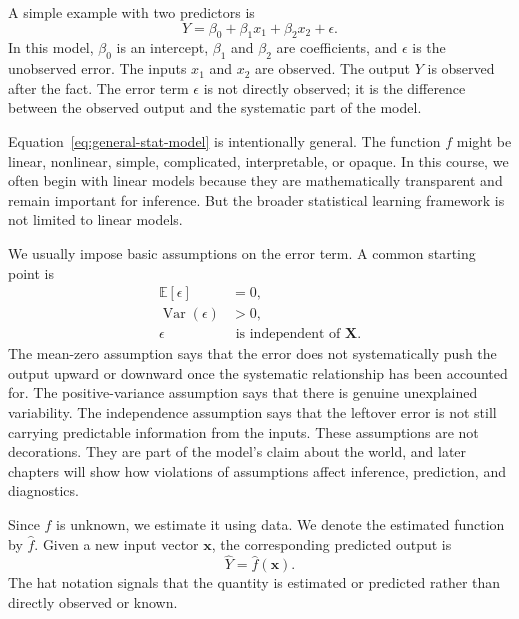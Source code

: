 A simple example with two predictors is
\begin{equation}
  Y = \beta_0 + \beta_1 x_1 + \beta_2 x_2 + \epsilon.
  \label{eq:first-linear-example}
\end{equation}
In this model, $\beta_0$ is an intercept, $\beta_1$ and $\beta_2$ are coefficients, and $\epsilon$ is the unobserved error.  The inputs $x_1$ and $x_2$ are observed.  The output $Y$ is observed after the fact.  The error term $\epsilon$ is not directly observed; it is the difference between the observed output and the systematic part of the model.

Equation~\eqref{eq:general-stat-model} is intentionally general.  The function $f$ might be linear, nonlinear, simple, complicated, interpretable, or opaque.  In this course, we often begin with linear models because they are mathematically transparent and remain important for inference.  But the broader statistical learning framework is not limited to linear models.

We usually impose basic assumptions on the error term.  A common starting point is
\begin{align}
  \mathbb{E}[\epsilon] &= 0, \label{eq:error-mean-zero}\\
  \operatorname{Var}(\epsilon) &> 0, \label{eq:error-positive-variance}\\
  \epsilon &\text{ is independent of } \mathbf{X}. \label{eq:error-independent}
\end{align}
The mean-zero assumption says that the error does not systematically push the output upward or downward once the systematic relationship has been accounted for.  The positive-variance assumption says that there is genuine unexplained variability.  The independence assumption says that the leftover error is not still carrying predictable information from the inputs.  These assumptions are not decorations.  They are part of the model's claim about the world, and later chapters will show how violations of assumptions affect inference, prediction, and diagnostics.

Since $f$ is unknown, we estimate it using data.  We denote the estimated function by $\hat{f}$.  Given a new input vector $\mathbf{x}$, the corresponding predicted output is
\begin{equation}
  \widehat{Y} = \hat{f}(\mathbf{x}).
  \label{eq:prediction-general}
\end{equation}
The hat notation signals that the quantity is estimated or predicted rather than directly observed or known.

